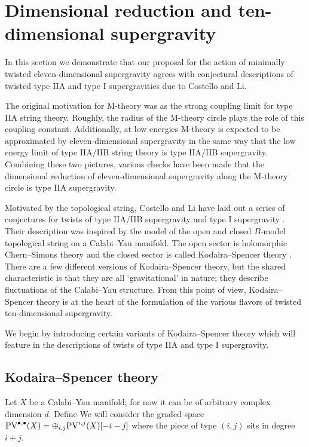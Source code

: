 \def\im{{\rm i}}

\section{Dimensional reduction and ten-dimensional supergravity}
\label{sec:dimred}

In this section we demonstrate that our proposal for the action of minimally twisted eleven-dimensional supergravity agrees with conjectural descriptions of twisted type IIA and type I supergravities due to Costello and Li. 

The original motivation for M-theory was as the strong coupling limit for type IIA string theory.
Roughly, the radius of the M-theory circle plays the role of this coupling constant. 
Additionally, at low energies M-theory is expected to be approximated by eleven-dimensional supergravity in the same way that the low energy limit of type IIA/IIB string theory is type IIA/IIB supergravity. 
Combining these two pictures, various checks have been made that the dimensional reduction of eleven-dimensional supergravity along the M-theory circle is type IIA supergravity. 

Motivated by the topological string, Costello and Li have laid out a series of conjectures for twists of type IIA/IIB supergravity \cite{CLsugra} and type I supergravity \cite{CLtypeI}. 
Their description was inspired by the model of the open and closed $B$-model topological string on a Calabi--Yau manifold. 
The open sector is holomorphic Chern--Simons theory \cite{WittenOpen} and the closed sector is called Kodaira--Spencer theory \cite{BCOV}. 
There are a few different versions of Kodaira--Spencer theory, but the shared characteristic is that they are all `gravitational' in nature; they describe fluctuations of the Calabi--Yau structure. 
From this point of view, Kodaira--Spencer theory is at the heart of the formulation of the various flavors of twisted ten-dimensional supergravity.

We begin by introducing certain variants of Kodaira--Spencer theory which will feature in the descriptions of twists of type IIA and type I supergravity.

\subsection{Kodaira--Spencer theory}
\label{s:BCOV}

Let $X$ be a Calabi--Yau manifold; for now it can be of arbitrary complex dimension $d$. 
Define
We will consider the graded space ${\rm PV}^{\bullet,\bullet}(X) = \oplus_{i,j} {\rm PV}^{i,j}(X)[-i-j]$ where the piece of type $(i,j)$ sits in degree $i+j$. 

